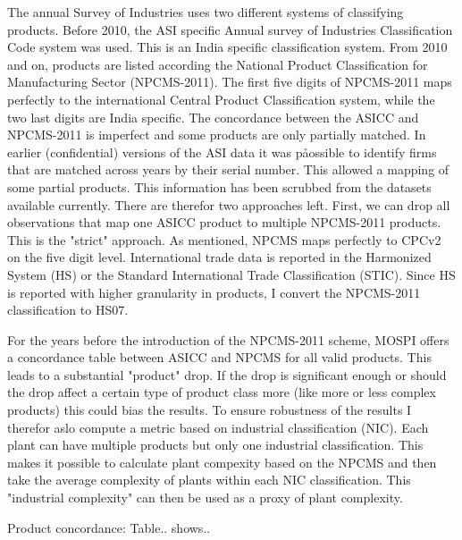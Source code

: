 The annual Survey of Industries uses two different systems of classifying products. Before 2010, the ASI specific Annual survey of Industries Classification Code system was used. This is an India specific classification system. From 2010 and on, products are listed according the National Product Classification for Manufacturing Sector (NPCMS-2011). The first five digits of NPCMS-2011 maps perfectly to the international Central Product Classification system, while the two last digits are India specific. The concordance between the ASICC and NPCMS-2011 is imperfect and some products are only partially matched. In earlier (confidential) versions of the ASI data it was påossible to identify firms that are matched across years by their serial number. This allowed a mapping of some partial products. This information has been scrubbed from the datasets available currently. There are therefor two approaches left. First, we can drop all observations that map one ASICC product to multiple NPCMS-2011 products. This is the "strict" approach. 
As mentioned, NPCMS maps perfectly to CPCv2 on the five digit level. International trade data is reported in the Harmonized System (HS) or the Standard International Trade Classification (STIC). Since HS is reported with higher granularity in products, I convert the NPCMS-2011 classification to HS07.



For the years before the introduction of the NPCMS-2011 scheme, MOSPI offers a concordance table between ASICC and NPCMS for all valid products. This leads to a substantial "product" drop. If the drop is significant enough or should the drop affect a certain type of product class more (like more or less complex products) this could bias the results. To ensure robustness of the results I therefor aslo compute a metric based on industrial classification (NIC). Each plant can have multiple products but only one industrial classification. This makes it possible to calculate plant compexity based on the NPCMS and then take the average complexity of plants within each NIC classification. This "industrial complexity" can then be used as a proxy of plant complexity.


Product concordance:
Table.. shows..


